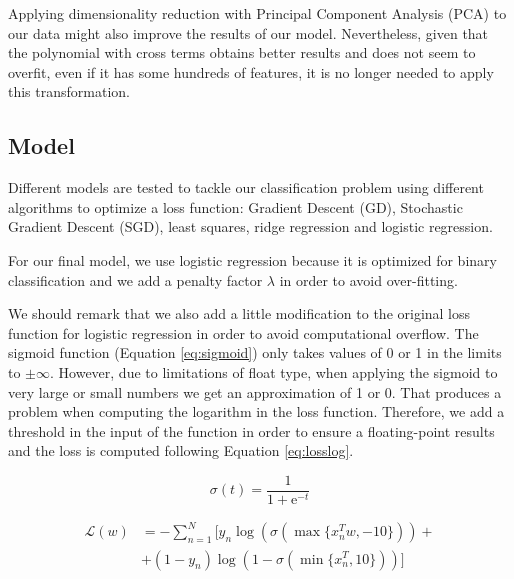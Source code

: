 \documentclass[10pt,conference,compsocconf]{IEEEtran}
\begin{document}
Applying dimensionality reduction with Principal Component Analysis (PCA) to our data might also improve the results of our model. Nevertheless, given that the polynomial with cross terms obtains better results and does not seem to overfit, even if it has some hundreds of features, it is no longer needed to apply this transformation.

\subsection{Model}
\label{sec:model}

Different models are tested to tackle our classification problem using different algorithms to optimize a loss function: Gradient Descent (GD), Stochastic Gradient Descent (SGD), least squares, ridge regression and logistic regression.

For our final model, we use logistic regression because it is optimized for binary classification and we add a penalty factor $\lambda$ in order to avoid over-fitting. 

We should remark that we also add a little modification to the original loss function for logistic regression in order to avoid computational overflow. The sigmoid function (Equation \ref{eq:sigmoid}) only takes values of 0 or 1 in the limits to $\pm \infty$. However, due to limitations of float type, when applying the sigmoid to very large or small numbers we get an approximation of 1 or 0. That produces a problem when computing the logarithm in the loss function. Therefore, we add a threshold in the input of the function in order to ensure a floating-point results and the loss is computed following Equation \ref{eq:losslog}.

\begin{equation}
    \sigma(t) = \frac{1}{1 + \mathrm{e}^{-t}}
    \label{eq:sigmoid}
\end{equation}

\begin{align}
    \mathcal{L}(w) &= - \sum_{n=1}^{N} \lbrack y_n \log (\sigma (\max\{x_n^T w, -10\})) + \\&+ (1 - y_n) \log (1- \sigma (\min\{ x_n^T, 10\})) \rbrack
    \label{eq:losslog}
\end{align}
\end{document}
